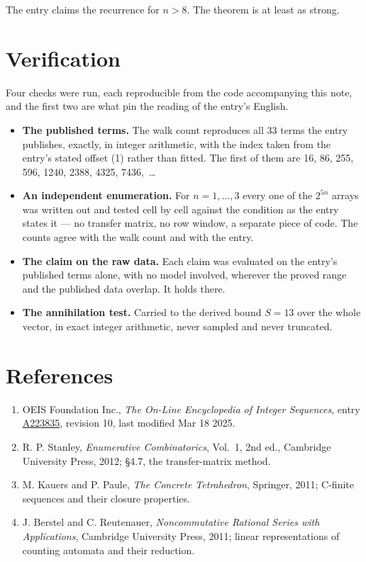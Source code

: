 \documentclass[11pt]{article}
\theoremstyle{definition}
\begin{document}
The entry claims the recurrence for $n > 8$. The theorem is at least as strong.

\section{Verification}

Four checks were run, each reproducible from the code accompanying this note, and the first two are what pin the reading of the entry's English.

\begin{itemize}

\item {\bfseries The published terms.} The walk count reproduces all 33 terms the entry publishes, exactly, in integer arithmetic, with the index taken from the entry's stated offset (1) rather than fitted. The first of them are 16, 86, 255, 596, 1240, 2388, 4325, 7436,~\dots

\item {\bfseries An independent enumeration.} For $n = 1,\dots,3$ every one of the $2^{5n}$ arrays was written out and tested cell by cell against the condition as the entry states it --- no transfer matrix, no row window, a separate piece of code. The counts agree with the walk count and with the entry.

\item {\bfseries The claim on the raw data.} Each claim was evaluated on the entry's published terms alone, with no model involved, wherever the proved range and the published data overlap. It holds there.

\item {\bfseries The annihilation test.} Carried to the derived bound $S = 13$ over the whole vector, in exact integer arithmetic, never sampled and never truncated.

\end{itemize}

\section{References}

\begin{enumerate}

\item OEIS Foundation Inc., \emph{The On-Line Encyclopedia of Integer Sequences}, entry \href{https://oeis.org/A223835}{A223835}, revision 10, last modified Mar 18 2025.

\item R. P. Stanley, \emph{Enumerative Combinatorics}, Vol.~1, 2nd ed., Cambridge University Press, 2012; \S4.7, the transfer-matrix method.

\item M. Kauers and P. Paule, \emph{The Concrete Tetrahedron}, Springer, 2011; C-finite sequences and their closure properties.

\item J. Berstel and C. Reutenauer, \emph{Noncommutative Rational Series with Applications}, Cambridge University Press, 2011; linear representations of counting automata and their reduction.

\end{enumerate}
\end{document}
